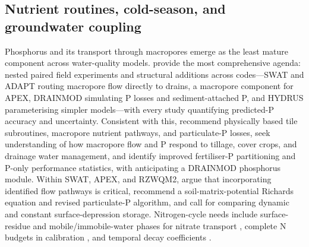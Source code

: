 \documentclass[11pt]{article}
\begin{document}
\subsection{Nutrient routines, cold-season, and groundwater coupling}

Phosphorus and its transport through macropores emerge as the least mature
component across water-quality models. \textcite{Radcliffe2015} provide the most
comprehensive agenda: nested paired field experiments and structural additions
across codes---SWAT and ADAPT routing macropore flow directly to drains, a
macropore component for APEX, DRAINMOD simulating P losses and sediment-attached
P, and HYDRUS parameterising simpler models---with every study quantifying
predicted-P accuracy and uncertainty. Consistent with this,
\textcite{Guo2020b} recommend physically based tile subroutines, macropore
nutrient pathways, and particulate-P losses, \textcite{Ford2017} seek
understanding of how macropore flow and P respond to tillage, cover crops, and
drainage water management, and \textcite{BinShokrana2023b} identify improved
fertiliser-P partitioning and P-only performance statistics, with
\textcite{Gowda2012} anticipating a DRAINMOD phosphorus module. Within SWAT,
APEX, and RZWQM2, \textcite{Williams2016} argue that incorporating identified
flow pathways is critical, \textcite{Qi2018} recommend a soil-matrix-potential
Richards equation and revised particulate-P algorithm, and
\textcite{Moriasi2012} call for comparing dynamic and constant surface-depression
storage. Nitrogen-cycle needs include surface-residue and mobile/immobile-water
phases for nitrate transport \parencite{Malone2017}, complete N budgets in
calibration \parencite{Gillette2018}, and temporal decay coefficients
\parencite{Rudra2005}.
\end{document}

